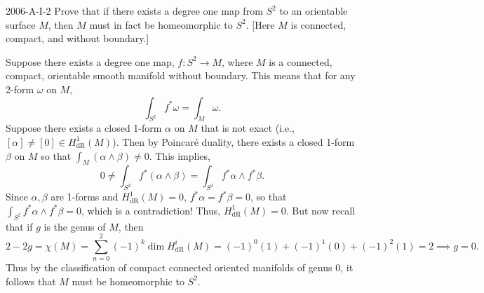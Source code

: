 \documentclass{article}
\begin{document}
	\begin{prb}{2006-A-I-2}
		Prove that if there exists a degree one map from $S^2$ to an orientable surface $M$, then $M$ must in fact be homeomorphic to $S^2$. [Here $M$ is connected, compact, and without boundary.]
	\end{prb}
	Suppose there exists a degree one map, $f: S^2 \to M$, where $M$ is a connected, compact, orientable smooth manifold without boundary. This means that for any 2-form $\omega$ on $M$, 
	\begin{equation*}
		\int_{S^2}f^\ast \omega = \int_{M}\omega. 
	\end{equation*}
	Suppose there exists a closed 1-form $\alpha$ on $M$ that is not exact (i.e., $[\alpha] \neq [0] \in H^1_{\text{dR}}(M)$). Then by Poincar\'e duality, there exists a closed 1-form $\beta$ on $M$ so that $\int_{M}(\alpha \wedge \beta) \neq 0$. This implies,
	\begin{equation*}
		0 \neq \int_{S^2}f^{\ast}(\alpha \wedge \beta) = \int_{S^2}f^\ast\alpha \wedge f^\ast \beta. 
	\end{equation*}
	Since $\alpha, \beta$ are 1-forms and $H^1_\text{dR}(M) = 0$, $f^\ast\alpha = f^\ast\beta = 0$, so that $\int_{S^2}f^\ast\alpha \wedge f^\ast \beta = 0$, which is a contradiction! Thus, $H^1_{\text{dR}}(M) =0$. But now recall that if $g$ is the genus of $M$, then 
	\begin{equation*}
		2 - 2g = \chi(M) = \sum_{n = 0}^{2}(-1)^{k}\dim H^{i}_{\text{dR}}(M) = (-1)^0(1) + (-1)^1(0) + (-1)^2(1) = 2 \implies g =0. 
	\end{equation*}
	Thus by the classification of compact connected oriented manifolds of genus $0$, it follows that $M$ must be homeomorphic to $S^2$. 
	
\end{document}
